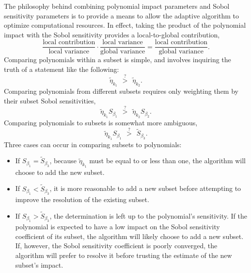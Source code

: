 The philosophy behind combining polynomial impact parameters and Sobol sensitivity parameters is to provide a
means to allow the adaptive algorithm to optimize computational resources.  In effect, taking the product of
the polynomial impact with the Sobol sensitivity provides a local-to-global contribution,
\begin{equation}
  \frac{\text{local contribution}}{\text{local variance}} \cdot \frac{\text{local variance}}{\text{global
        variance}} = \frac{\text{local contribution}}{\text{global variance}}.
\end{equation}
Comparing polynomials within a subset is simple, and involves inquiring the truth of a statement like the
following:
\begin{equation}
  \tilde\eta_{k_1} \hspace{5pt}\stackrel{?}>\hspace{5pt} \tilde\eta_{k_2}.
\end{equation}
Comparing polynomials from different subsets requires only weighting them by their subset Sobol sensitivities,
\begin{equation}
  \tilde\eta_{k_1}S_{\beta_1} \hspace{5pt}\stackrel{?}>\hspace{5pt} \tilde\eta_{k_2}S_{\beta_2}.
\end{equation}
Comparing polynomials to subsets is somewhat more ambiguous,
\begin{equation}
  \tilde\eta_{k_1}S_{\beta_1} \hspace{5pt}\stackrel{?}>\hspace{5pt} \tilde S_{\beta_3}.
\end{equation}
Three cases can occur in comparing subsets to polynomials:
\begin{itemize}
  \item If $S_{\beta_1} = \tilde S_{\beta_3}$, because $\tilde\eta_{k_1}$ must be equal to or less than one,
    the algorithm will choose to add the new subset.
  \item If $S_{\beta_1} < \tilde S_{\beta_3}$, it is more reasonable to add a new subset before attempting to 
    improve the resolution of the existing subset.
  \item If $S_{\beta_1} > \tilde S_{\beta_3}$, the determination is left up to the polynomial's sensitivity.
    If the polynomial is expected to have a low impact on the Sobol sensitivity coefficient of its subset, the
    algorithm will likely choose to add a new subset.  If, however, the Sobol sensitivity coefficient is
    poorly converged, the algorithm will prefer to resolve it before trusting the estimate of the new subset's
    impact.
\end{itemize}

